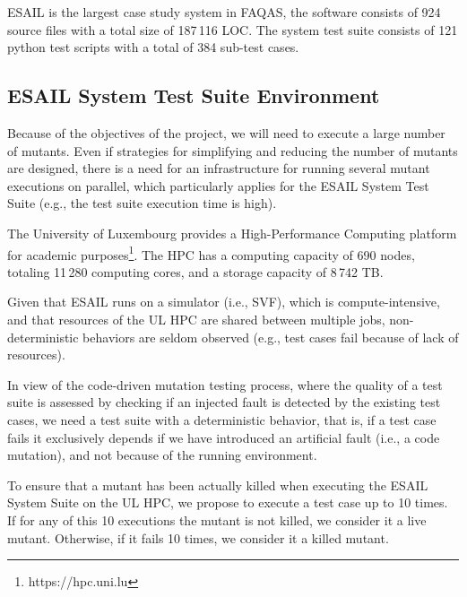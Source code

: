 
ESAIL is the largest case study system in FAQAS, the software consists of 924 source files with a total size of 187\,116 LOC. The system test suite consists of 121 python test scripts with a total of 384 sub-test cases.

\subsection{ESAIL System Test Suite Environment}

Because of the objectives of the project, we will need to execute a large number of mutants. Even if strategies for simplifying and reducing the number of mutants are designed, there is a need for an infrastructure for running several mutant executions on parallel, which particularly applies for the ESAIL System Test Suite (e.g., the test suite execution time is high).

The University of Luxembourg provides a High-Performance Computing platform for academic purposes\footnote{https://hpc.uni.lu}.
The HPC has a computing capacity of 690 nodes, totaling 11\,280 computing cores, and a storage capacity of 8\,742 TB.

Given that ESAIL runs on a simulator (i.e., SVF), which is compute-intensive, and that resources of the UL HPC are shared between multiple jobs, non-deterministic behaviors are seldom observed (e.g., test cases fail because of lack of resources).

In view of the code-driven mutation testing process, where the quality of a test suite is assessed by checking if an injected fault is detected by the existing test cases, we need a test suite with a deterministic behavior, that is, if a test case fails it exclusively depends if we have introduced an artificial fault (i.e., a code mutation), and not because of the running environment.

To ensure that a mutant has been actually killed when executing the ESAIL System Suite on the UL HPC, we propose to execute a test case up to 10 times. If for any of this 10 executions the mutant is not killed, we consider it a live mutant. Otherwise, if it fails 10 times, we consider it a killed mutant.




